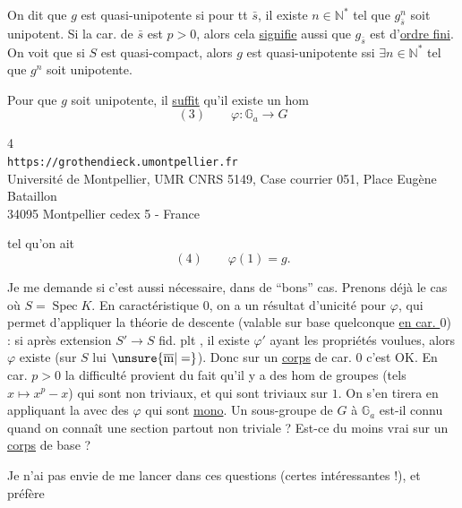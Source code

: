 On dit que $g$ est quasi-unipotente si pour tt $\bar s$, il existe
$n\in\mathbb N^*$ tel que $g_{\bar s}^{n}$ soit unipotent.
Si la car. de $\bar s$ est $p>0$, alors cela \uline{signifie} aussi que
$g_{\bar s}$ est d'\uline{ordre fini}. On voit que si $S$ est
quasi-compact, alors $g$ est quasi-unipotente ssi
$\exists n\in\mathbb N^*$ tel que $g^n$ soit unipotente.


 Pour que $g$ soit unipotente, il \uline{suffit} qu'il existe un hom
\[
(3)\qquad \varphi:\mathbb G_a\longrightarrow G
\]

\begin{center}
\small
4\\
\texttt{https://grothendieck.umontpellier.fr}\\
Université de Montpellier, UMR CNRS 5149, Case courrier 051, Place Eugène Bataillon\\
34095 Montpellier cedex 5 - France
\end{center}

tel qu'on ait
\[
(4)\qquad \varphi(1)=g.
\]

Je me demande si c'est aussi nécessaire, dans de ``bons'' cas. Prenons déjà le
cas où $S=\operatorname{Spec}K$. En caractéristique $0$, on a un résultat
d'unicité pour $\varphi$, qui permet d'appliquer la théorie de descente
(valable sur base quelconque \uline{en car. $0$}) : si après extension
$S'\longrightarrow S$ fid. plt , il existe $\varphi'$ ayant
les propriétés voulues, alors $\varphi$ existe
(sur $S$ lui $\unsure{\overline{\mathrm m}|=}$).
Donc sur un \uline{corps} de car. $0$ c'est OK. En car. $p>0$ la difficulté
provient du fait qu'il y a des hom de groupes
(tels $x\mapsto x^p-x$) qui sont  non triviaux, et qui sont
triviaux sur $1$. On s'en tirera  en appliquant
la  avec des $\varphi$ qui sont \uline{mono}.
 
Un sous-groupe de $G$  à $\mathbb G_a$ est-il connu quand
on connaît une section partout non triviale ? Est-ce du moins vrai sur un
\uline{corps} de base ?

Je n'ai pas envie de me lancer dans ces questions (certes intéressantes !),
et préfère

